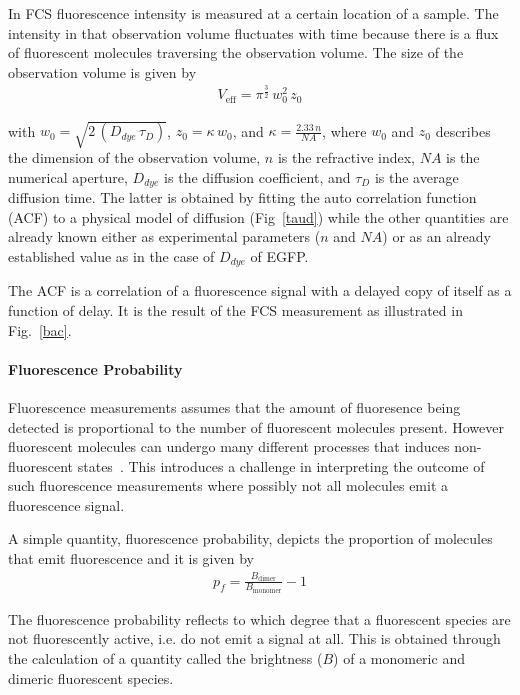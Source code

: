In FCS fluorescence intensity is measured at a certain location of a sample. 
The intensity in that observation volume fluctuates with time because there is a flux of fluorescent molecules traversing the observation volume. 
The size of the observation volume is given by 
\begin{align} 
V_{\text{eff}} = \pi^{\frac{3}{2}}\,w_{0}^{2}\,z_{0}
\label{eqn:veff}
\end{align}

with $w_{0} = \sqrt{2\,(D_{dye}\,\tau_{D})}$, $z_{0} = \kappa\,w_{0}$, and $\kappa = \frac{2.33\,n}{NA}$, where $w_{0}$ and $z_{0}$ describes the dimension of the observation volume, $n$ is the refractive index, $NA$ is the numerical aperture, $D_{dye}$ is the diffusion coefficient, and $\tau_{D}$ is the average diffusion time. 
The latter is obtained by fitting the auto correlation function (ACF) to a physical model of diffusion (Fig~\ref{taud}) while the other quantities are already known either as experimental parameters ($n$ and $NA$) or as an already established value as in the case of $D_{dye}$ of EGFP.

The ACF is a correlation of a fluorescence signal with a delayed copy of itself as a function of delay. 
It is the result of the FCS measurement as illustrated in Fig.~\ref{bac}. 

\paragraph{Fluorescence Probability}
Fluorescence measurements assumes that the amount of fluoresence being detected is proportional to the number of fluorescent molecules present. 
However fluorescent molecules can undergo many different processes that induces non-fluorescent states~\cite{Dunsing2018}. 
This introduces a challenge in interpreting the outcome of such fluorescence measurements where possibly not all molecules emit a fluorescence signal.  

A simple quantity, fluorescence probability, depicts the proportion of molecules that emit fluorescence and it is given by 
\begin{align}
p_{f}= \frac{B_{\text{dimer}}}{B_{\text{monomer}}}-1
\label{eqn:pf}
\end{align}

The fluorescence probability reflects to which degree that a fluorescent species are not fluorescently active, i.e. do not emit a signal at all. 
This is obtained through the calculation of a quantity called the brightness ($B$) of a monomeric and dimeric fluorescent species.

